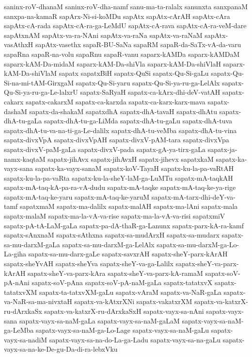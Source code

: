 {saninx-roV-dhanaM
saninx-roV-dha-namf
sanu-ma-ta-ralalx
sanunxta
sanxpanaM
sanxpa-na-kamaR
sapArx-Ni-si-koMDu
sapAtx
sapAtx-cArAH
sapAtx-cAra
sapAtx-cA-rada
sapAtx-cA-ra-ga-LeMdU
sapAtx-cA-rava
sapAtx-cA-ra-veM-dare
sapAtxnAM
sapAtx-va-ra-NAni
sapAtx-va-raNa
sapAtx-va-raNaM
sapAtx-vasAthxH
sapAtx-vasethx
sapaR-BU-SaNa
sapaRM
sapaR-da-SaTx-vA-da-varu
sapaRna
sapaR-na-volu
sapaRnu
sapaR-vanu
saparx-kAMDa
saparx-kAMDaM
saparx-kAM-Da-midaM
saparx-kAM-Da-shiVla
saparx-kAM-Da-shiVlaH
saparx-kAM-Da-shiVlaM
sapatx
sapatxBiH
sapatx-QuSi
sapatx-Qu-Si-gaLu
sapatx-Qu-Si-na-mi-tAM-GirxgaM
sapatx-Qu-Si-yaru
sapatx-Qu-Si-ya-ru-ga-LelAlx
sapatx-Qu-Si-ya-ru-ga-Le-lalxrU
sapatx-SaRyaH
sapatx-ca-kArx-dhi-deV-vatAH
sapatx-cakarx
sapatx-cakarxM
sapatx-ca-karxda
sapatx-ca-karx-karx-mava
sapatx-dashaM
sapatx-da-shakaM
sapatxdhA
sapatx-dhA-tavaH
sapatx-dhAtu
sapatx-dhA-tu-gaLa
sapatx-dhA-tu-ga-LiMda
sapatx-dhA-tu-gaLu
sapatx-dhA-tuva
sapatx-dhA-tu-va-na-ti-ga-Le-dalilx
sapatx-dhA-tu-veMba
sapatx-dhA-tu-vina
sapatx-divxVpA
sapatx-divxVpAH
sapatx-divxV-pAM-tara
sapatx-divxVpa
sapatx-divxV-paM-gaLa
sapatx-divxV-pada
sapatx-gA-ya-tirx-gaLa
sapatx-ja-namx-kaqtaM
sapatx-jihAvx
sapatx-jihAvxH
sapatx-jihevx
sapatxkaM
sapatx-ka-vayx-sana
sapatx-ka-vayx-sanaM
sapatx-koV-TayaH
sapatx-ku-la-pa-vaRtAH
sapatx-ku-la-pa-vaRta
sapatx-ku-la-sheY-laM-ga-LuMTu
sapatx-mA-taqkAH
sapatx-mA-taq-kA-pa-ra-vA-dudu
sapatx-mA-taqke
sapatx-mA-taq-ke-ya-rige
sapatx-mA-taq-ke-yaru
sapatx-mA-taq-ke-yaruM
sapatx-mA-tarx-dhi-deY-va-tamf
sapatxmaM
sapatx-ma-dalilx
sapatx-malAH
sapatx-ma-lAni
sapatx-mala
sapatx-malaM
sapatx-ma-la-vA-va-rise
sapatx-ma-la-vA-va-risi
sapatxmiV
sapatx-pA-tA-LaM-gaLa
sapatx-pa-dA-thaR-ga-Lanunx
sapatx-parx-kA-ra-kamf
sapatx-sAnxnaM
sapatx-sAthxna
sapatx-sa-mudArxH
sapatx-sa-mudarx
sapatx-sa-mu-darxM-gaLa
sapatx-sa-mu-darxM-ga-LelAlx
sapatx-sa-mu-darxM-ga-Lo-La-giha
sapatx-sa-mu-darx-gaLe
sapatx-savxrAH
sapatx-sheY-parx-kArAH
sapatx-sheYvAH
sapatx-sheYva
sapatx-sheY-va-ga-Lalilx
sapatx-sheY-va-parx-kArAH
sapatx-sheY-va-parx-kAra
sapatx-sheY-va-parx-kA-ramaM
sapatx-soV-pA-nAni
sapatx-soV-pAna
sapatx-soV-pA-naM-gaLa
sapatx-tatatxvX
sapatx-tatatxvXM
sapatx-ta-tatxvXM-gaLu
sapatx-vAraM
sapatx-va-NaR-gaLa
sapatx-va-NaR-sa-ma-nivxtaH
sapatx-va-kAtxrXNi
sapatx-vakatxrXM
sapatx-va-katxrX-ru-dArxkaSx
sapatx-va-katxrX-ru-dArxkaSxH
sapatx-vayx-sa-nAni
sapatx-vayx-sana
sapatx-vayx-sa-naM-gaLa
sapatx-vayx-sa-naM-gaLaM
sapatx-vayx-sa-naM-ga-LeMba
sapatx-vayx-sa-naM-ga-Lo-Lage
sapatx-vayx-sa-naM-gaLu
sapatx-vayx-sa-nadiM
sapatx-vayx-sa-na-do-La-ga-Ladu
sapatx-vayx-sa-na-gaLu
sapatx-vayx-sa-na-ke-De-gu-Da-di-ra-lebxVku
}
